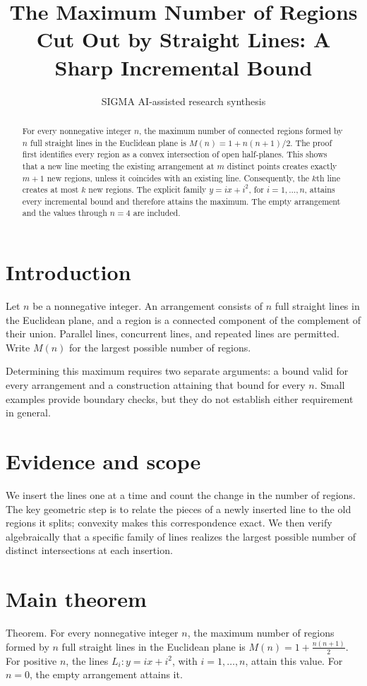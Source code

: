 \documentclass[11pt]{article}
\title{The Maximum Number of Regions Cut Out by Straight Lines: A Sharp Incremental Bound}
\date{}
\author{SIGMA AI-assisted research synthesis}
\begin{document}
\maketitle

\begin{abstract}
For every nonnegative integer $n$, the maximum number of connected regions formed by $n$ full straight lines in the Euclidean plane is $M(n)=1+n(n+1)/2$. The proof first identifies every region as a convex intersection of open half-planes. This shows that a new line meeting the existing arrangement at $m$ distinct points creates exactly $m+1$ new regions, unless it coincides with an existing line. Consequently, the $k$th line creates at most $k$ new regions. The explicit family $y=ix+i^2$, for $i=1,\ldots,n$, attains every incremental bound and therefore attains the maximum. The empty arrangement and the values through $n=4$ are included.
\end{abstract}
\section{Introduction}
Let $n$ be a nonnegative integer. An arrangement consists of $n$ full straight lines in the Euclidean plane, and a region is a connected component of the complement of their union. Parallel lines, concurrent lines, and repeated lines are permitted. Write $M(n)$ for the largest possible number of regions.

Determining this maximum requires two separate arguments: a bound valid for every arrangement and a construction attaining that bound for every $n$. Small examples provide boundary checks, but they do not establish either requirement in general.

\section{Evidence and scope}
We insert the lines one at a time and count the change in the number of regions. The key geometric step is to relate the pieces of a newly inserted line to the old regions it splits; convexity makes this correspondence exact. We then verify algebraically that a specific family of lines realizes the largest possible number of distinct intersections at each insertion.

\section{Main theorem}
Theorem. For every nonnegative integer $n$, the maximum number of regions formed by $n$ full straight lines in the Euclidean plane is $M(n)=1+\frac{n(n+1)}{2}$. For positive $n$, the lines $L_i:y=ix+i^2$, with $i=1,\ldots,n$, attain this value. For $n=0$, the empty arrangement attains it.
\end{document}
